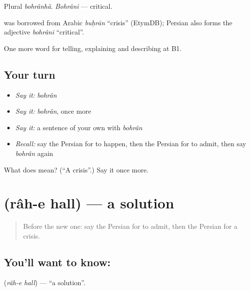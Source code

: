 Plural \emph{bohrânhâ}. \emph{Bohrâni} — critical.

\begin{cousinweb}
\textbf{} was borrowed from Arabic \emph{buḥrān} \textquotedblleft{}crisis\textquotedblright{} (EtymDB); Persian also forms the adjective \emph{bohrâni} \textquotedblleft{}critical\textquotedblright{}.
\end{cousinweb}

\begin{grammarlens}[title={What you've built}]
One more word for telling, explaining and describing at B1.
\end{grammarlens}

\subsection*{Your turn}
\begin{itemize}
\raggedright
  \item \emph{Say it:} \emph{bohrân}
  \item \emph{Say it:} \emph{bohrân}, once more
  \item \emph{Say it:} a sentence of your own with \emph{bohrân}
  \item \emph{Recall:} say the Persian for to happen, then the Persian for to admit, then say \emph{bohrân} again
\end{itemize}

\begin{tcolorbox}[breakable,colback=teal!4,colframe=teal!35!black,title={Before you move on}]
What does  mean? (\textquotedblleft{}A crisis\textquotedblright{}.) Say it once more.
\end{tcolorbox}
\section[\texorpdfstring{\fa{راه} \fa{حل} (râh-e hall)}{راه حل (râh-e hall)}]{  (râh-e hall) — a solution}

\label{lesson:FA-C377-rah-e-hall}



\begin{quote}
Before the new one: say the Persian for to admit, then the Persian for a crisis.
\end{quote}

\subsection*{You'll want to know:  }
\textbf{ } (\emph{râh-e hall}) — \textquotedblleft{}a solution\textquotedblright{}.

